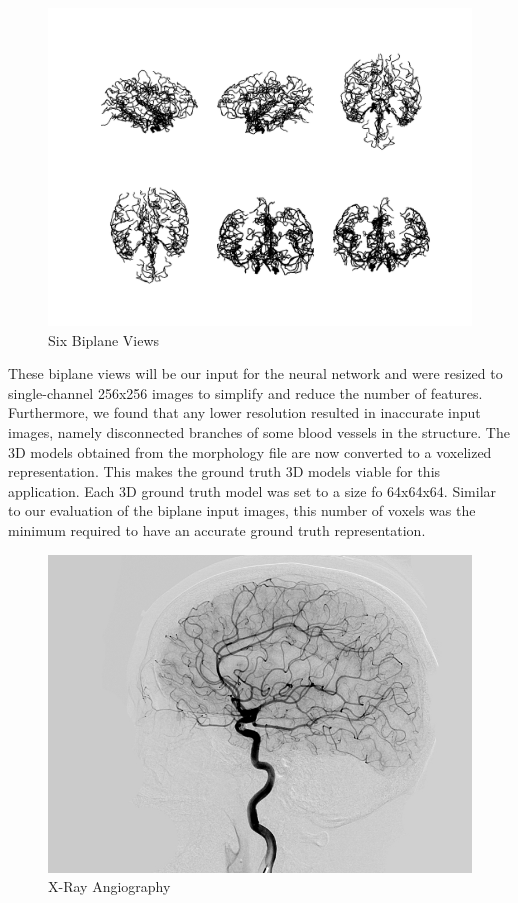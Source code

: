\documentclass[conference, 10pt]{IEEEtran}
\begin{document}
\begin{figure}[h]
    \centering
    \includegraphics[scale=0.21]{figure_1.png}
    \caption{Six Biplane Views}
\end{figure}

These biplane views will be our input for the neural network and were resized to single-channel 256x256 images to simplify and reduce the number of features. Furthermore, we found that any lower resolution resulted in inaccurate input images, namely disconnected branches of some blood vessels in the structure. The 3D models obtained from the morphology file are now converted to a voxelized representation. This makes the ground truth 3D models viable for this application. Each 3D ground truth model was set to a size fo 64x64x64. Similar to our evaluation of the biplane input images, this number of voxels was the minimum required to have an accurate ground truth representation.

\begin{figure}[h]
    \centering
    \includegraphics[scale=0.25]{figure_2.jpg}
    \caption{X-Ray Angiography}
\end{figure}
\end{document}
